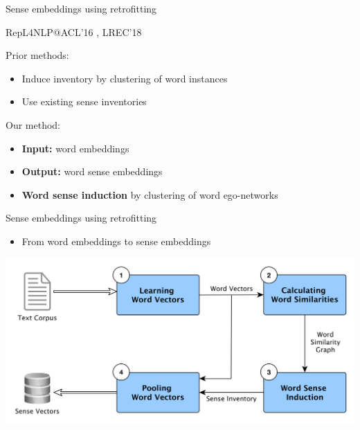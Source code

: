 \documentclass[usenames,dvipsnames]{beamer}
\begin{document}
\begin{frame}{Sense embeddings using retrofitting}
	
	 {\footnotesize RepL4NLP@ACL'16 \cite{pelevina-EtAl:2016:RepL4NLP}, LREC'18 \cite{remus:2018}}
	
	\begin{block}{Prior methods:}
		\vspace{0.25cm}

	\begin{itemize}	
	\item Induce inventory by \alert{clustering of word instances} %
	\item Use \alert{existing} sense inventories %
	\end{itemize}
\end{block}


	\begin{block}{Our method:}
		\vspace{0.25cm}

	\begin{itemize}	
	\item \textbf{Input:} word embeddings
	\item \textbf{Output:} word sense embeddings
	\item \textbf{Word sense induction} by \alert{clustering of word ego-networks}

	\end{itemize}
\end{block}


\end{frame}

\begin{frame}{Sense embeddings using retrofitting}
\begin{itemize}
\item From word embeddings to sense embeddings
\end{itemize}
\includegraphics[width=\textwidth]{pipeline}

\end{frame}
\end{document}
